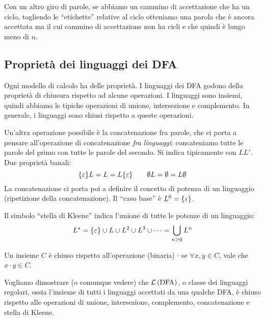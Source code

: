 Con un altro giro di parole, se abbiamo un cammino di accettazione che ha un ciclo, togliendo le ``etichette'' relative al ciclo otteniamo una parola che \`e ancora accettata ma il cui cammino di accettazione non ha cicli e che quindi \`e lungo meno di $n$.

\subsection{Propriet\`a dei linguaggi dei DFA}

Ogni modello di calcolo ha delle propriet\`a.
I linguaggi dei DFA godono della propriet\`a di chiusura rispetto ad alcune operazioni.
I linguaggi sono insiemi, quindi abbiamo le tipiche operazioni di unione, intersezione e complemento.
In generale, i linguaggi sono chiusi rispetto a queste operazioni.

Un'altra operazione possibile \`e la concatenazione fra parole, che ci porta a pensare all'operazione di concatenazione \emph{fra linguaggi}: concateniamo tutte le parole del primo con tutte le parole del secondo.
Si indica tipicamente con $L L'$.
Due propriet\`a banali:
\[
	\{ \varepsilon \} L = L = L \{ \varepsilon \} \qquad \emptyset L = \emptyset = L \emptyset
\]
La concatenazione ci porta poi a definire il concetto di potenza di un linguaggio (ripetizione della concatenazione).
Il ``caso base'' \`e $L^0 = \{ \varepsilon \}$.

Il simbolo ``stella di Kleene'' indica l'unione di tutte le potenze di un linguaggio:
\[
	L^{\star} = \{ \varepsilon \} \cup L \cup L^2 \cup L^3 \cup \dots = \bigcup_{n \ge 0} L^n
\]

Un insieme $C$ \`e chiuso rispetto all'operazione (binaria) $\cdot$ se $\forall x, y \in C$, vale che $x \cdot y \in C$.

Vogliamo dimostrare (o comunque vedere) che $\mathcal{L}\left( {\text{DFA}} \right)$, o classe dei linguaggi regolari, ossia l'insieme di tutti i linguaggi accettati da una qualche DFA, \`e chiuso rispetto alle operazioni di unione, intersezione, complemento, concatenazione e stella di Kleene.

